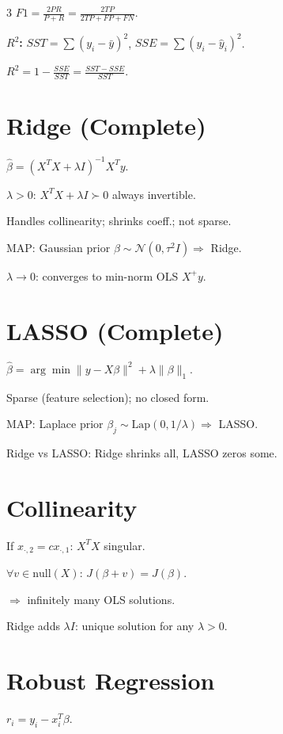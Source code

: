 \documentclass[8pt,fleqn]{extarticle}
\begin{document}
\begin{multicols}{3}
$F1=\frac{2PR}{P+R}=\frac{2TP}{2TP+FP+FN}$.

\textbf{$R^2$:}
$SST=\sum (y_i-\bar y)^2$,
$SSE=\sum (y_i-\hat y_i)^2$.

$R^2=1-\frac{SSE}{SST}=\frac{SST-SSE}{SST}$.

\section*{Ridge (Complete)}

$\hat\beta=(X^TX+\lambda I)^{-1}X^Ty$.

$\lambda>0$: $X^TX+\lambda I\succ0$ always invertible.

Handles collinearity; shrinks coeff.; not sparse.

MAP: Gaussian prior $\beta\sim\mathcal N(0,\tau^2 I)\Rightarrow$ Ridge.

$\lambda\to0$: converges to min-norm OLS $X^+y$.


\section*{LASSO (Complete)}

$\hat\beta=\arg\min\|y-X\beta\|^2+\lambda\|\beta\|_1$.

Sparse (feature selection); no closed form.

MAP: Laplace prior $\beta_j\sim\text{Lap}(0,1/\lambda)\Rightarrow$ LASSO.

Ridge vs LASSO: Ridge shrinks all, LASSO zeros some.


\section*{Collinearity}

If $x_{\cdot,2}=cx_{\cdot,1}$: $X^TX$ singular.

$\forall v\in\text{null}(X)$: $J(\beta+v)=J(\beta)$.

$\Rightarrow$ infinitely many OLS solutions.

Ridge adds $\lambda I$: unique solution for any $\lambda>0$.


\section*{Robust Regression}

$r_i=y_i-x_i^T\beta$.


\end{multicols}
\end{document}
